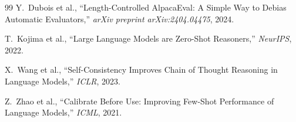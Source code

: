 \documentclass[11pt,a4paper]{article}
\begin{document}
\begin{thebibliography}{99}
Y.~Dubois et al.,
\newblock ``Length-Controlled AlpacaEval: A Simple Way to Debias Automatic Evaluators,''
\newblock \emph{arXiv preprint arXiv:2404.04475}, 2024.

T.~Kojima et al.,
\newblock ``Large Language Models are Zero-Shot Reasoners,''
\newblock \emph{NeurIPS}, 2022.

X.~Wang et al.,
\newblock ``Self-Consistency Improves Chain of Thought Reasoning in Language Models,''
\newblock \emph{ICLR}, 2023.

Z.~Zhao et al.,
\newblock ``Calibrate Before Use: Improving Few-Shot Performance of Language Models,''
\newblock \emph{ICML}, 2021.

\end{thebibliography}
\end{document}

